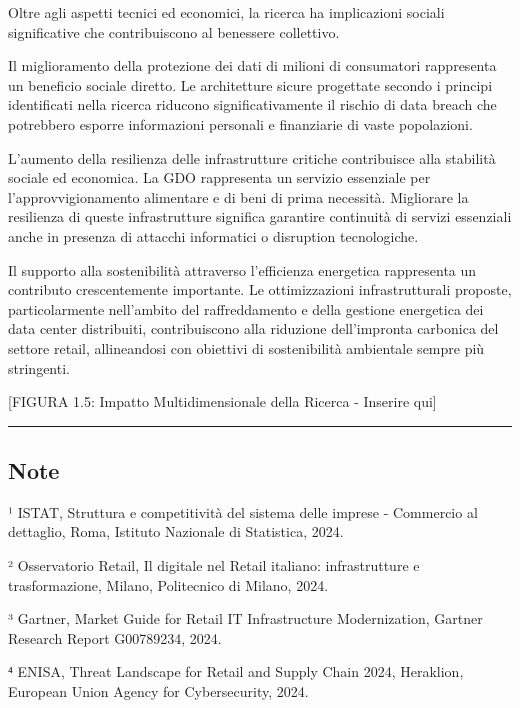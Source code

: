 \documentclass{report}
\begin{document}
Oltre agli aspetti tecnici ed economici, la ricerca ha implicazioni
sociali significative che contribuiscono al benessere collettivo.

Il miglioramento della protezione dei dati di milioni di consumatori
rappresenta un beneficio sociale diretto. Le architetture sicure
progettate secondo i principi identificati nella ricerca riducono
significativamente il rischio di data breach che potrebbero esporre
informazioni personali e finanziarie di vaste popolazioni.

L'aumento della resilienza delle infrastrutture critiche contribuisce
alla stabilità sociale ed economica. La GDO rappresenta un servizio
essenziale per l'approvvigionamento alimentare e di beni di prima
necessità. Migliorare la resilienza di queste infrastrutture significa
garantire continuità di servizi essenziali anche in presenza di attacchi
informatici o disruption tecnologiche.

Il supporto alla sostenibilità attraverso l'efficienza energetica
rappresenta un contributo crescentemente importante. Le ottimizzazioni
infrastrutturali proposte, particolarmente nell'ambito del
raffreddamento e della gestione energetica dei data center distribuiti,
contribuiscono alla riduzione dell'impronta carbonica del settore
retail, allineandosi con obiettivi di sostenibilità ambientale sempre
più stringenti.

{[}FIGURA 1.5: Impatto Multidimensionale della Ricerca - Inserire qui{]}

\begin{center}\rule{0.5\linewidth}{0.5pt}\end{center}

\subsection{\texorpdfstring{\textbf{Note}}{Note}}\label{note}

¹ ISTAT, Struttura e competitività del sistema delle imprese - Commercio
al dettaglio, Roma, Istituto Nazionale di Statistica, 2024.

² Osservatorio Retail, Il digitale nel Retail italiano: infrastrutture e
trasformazione, Milano, Politecnico di Milano, 2024.

³ Gartner, Market Guide for Retail IT Infrastructure Modernization,
Gartner Research Report G00789234, 2024.

⁴ ENISA, Threat Landscape for Retail and Supply Chain 2024, Heraklion,
European Union Agency for Cybersecurity, 2024.
\end{document}
